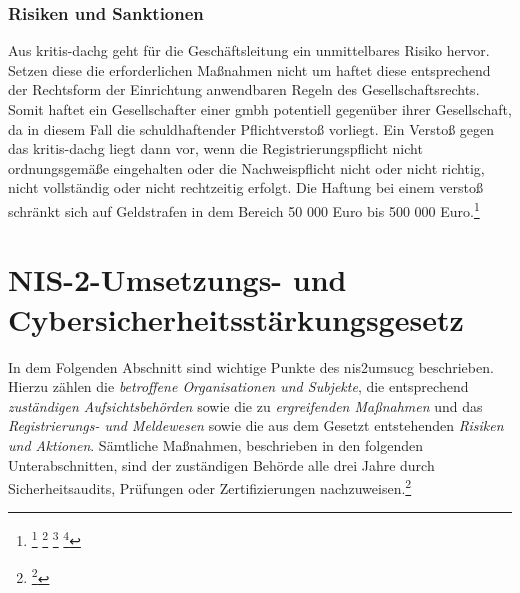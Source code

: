 \documentclass[11pt,a4paper,hidelinks]{article}   %
\begin{document}
                \subsubsection{Risiken und Sanktionen}
                Aus \gls{kritis-dachg} geht für die Geschäftsleitung ein unmittelbares Risiko hervor. Setzen diese die erforderlichen Maßnahmen nicht um haftet diese entsprechend der Rechtsform der Einrichtung anwendbaren Regeln des Gesellschaftsrechts. Somit haftet ein Gesellschafter einer \gls{gmbh} potentiell gegenüber ihrer Gesellschaft, da in diesem Fall die schuldhaftender Pflichtverstoß vorliegt. Ein Verstoß gegen das \gls{kritis-dachg} liegt dann vor, wenn die Registrierungspflicht nicht ordnungsgemäße eingehalten oder die Nachweispflicht nicht oder nicht richtig, nicht vollständig oder nicht rechtzeitig erfolgt. Die Haftung bei einem verstoß schränkt sich auf Geldstrafen in dem Bereich 50 000 Euro bis 500 000 Euro.\footnote{
                    \footcite[Vgl. §20, Absatz 2][]{KRITIS-DachG}
                    \footcite[Vgl. §24, Absatz 2][]{KRITIS-DachG}
                    \footcite[Vgl. §13, Absatz 2][]{GmbHG}
                    \footcite[Vgl. §43, Absatz 2][]{GmbHG}
                }

    \section{NIS-2-Umsetzungs- und Cybersicherheitsstärkungsgesetz}\label{sec:NIS2UmsuCG} %
        In dem Folgenden Abschnitt sind wichtige Punkte des \gls{nis2umsucg} beschrieben. Hierzu zählen die \emph{betroffene Organisationen und Subjekte}, die entsprechend \emph{zuständigen Aufsichtsbehörden} sowie die zu \emph{ergreifenden Maßnahmen} und das \emph{Registrierungs- und Meldewesen} sowie die aus dem Gesetzt entstehenden \emph{Risiken und Aktionen}. Sämtliche Maßnahmen, beschrieben in den folgenden Unterabschnitten, sind der zuständigen Behörde alle drei Jahre durch Sicherheitsaudits, Prüfungen oder Zertifizierungen nachzuweisen.\footnote{
            \footcite[Vgl. §39 Absatz 1,][]{NIS2UmsuCG}
        }
\end{document}

